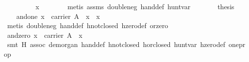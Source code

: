 \begin{isabellebody}
\ \ \ \ \isamarkupfalse%
\ \isamarkupfalse%
\ {}{}{}{}\ {}\ x{}\isanewline
\ \ \ \ \ \ \isamarkupfalse%
\ {}metis\ assms\ double{}neg\ hand{}def\ hunt{}var{}\isanewline
\ \ \ \ \isamarkupfalse%
\ \isamarkupfalse%
\ {}thesis\ \isamarkupfalse%
\isanewline
\ \ \isamarkupfalse%
%
\endisatagproof
{\isafoldproof}%
%
\isadelimproof
\isanewline
%
\endisadelimproof
\isanewline
\ \ \isamarkupfalse%
\ and{}one{}\ {}x\ {}\ carrier\ A\ {}\ x{}{}\ {}\ x{}\isanewline
%
\isadelimproof
\ \ \ \ %
\endisadelimproof
%
\isatagproof
{}\isamarkupfalse%
\ {}metis\ double{}neg\ hand{}def\ hnot{}closed\ hzero{}def\ or{}zero{}%
\endisatagproof
{\isafoldproof}%
%
\isadelimproof
\isanewline
%
\endisadelimproof
\isanewline
\ \ \isamarkupfalse%
\ and{}zero{}\ {}x\ {}\ carrier\ A\ {}\ x{}{}\ {}\ {}{}\isanewline
%
\isadelimproof
\ \ \ \ %
\endisadelimproof
%
\isatagproof
{}\isamarkupfalse%
\ {}smt\ H{}\ assoc\ de{}morgan{}\ hand{}def\ hnot{}closed\ hor{}closed\ hunt{}var\ hzero{}def\ one{}prop{}%

\end{isabellebody}
